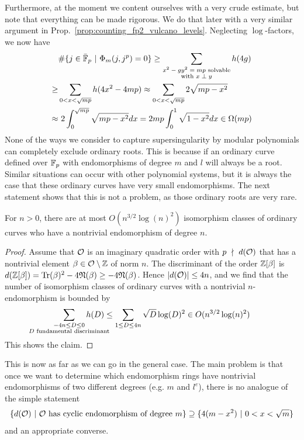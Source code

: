 Furthermore, at the moment we content ourselves with a very crude estimate, but note that everything can be made rigorous.
We do that later with a very similar argument in Prop.~\ref{prop:counting_fp2_vulcano_levels}.
Neglecting $\log$-factors, we now have
\begin{align*}
    &\#\{ j \in \bar{\mathbb{F}}_p \ | \ \Phi_m(j, j^p) = 0 \} \geq \sum_{\substack{\text{$x^2 - gy^2 = mp$ solvable}\\\text{with $x \perp y$}}} h(4g) \\
    \geq& \sum_{0 < x < \sqrt{mp}} h(4x^2 - 4m p) \approx \sum_{0 < x < \sqrt{mp}} 2\sqrt{mp - x^2} \\
    \approx& \ 2\int_0^{\sqrt{mp}} \sqrt{mp - x^2} dx = 2mp \int_0^1 \sqrt{1 - x^2} dx \in \Omega(m p)
\end{align*}
None of the ways we consider to capture supersingularity by modular polynomials can completely exclude ordinary roots.
This is because if an ordinary curve defined over $\mathbb{F}_p$ with endomorphisms of degree $m$ and $l$ will always be a root.
Similar situations can occur with other polynomial systems, but it is always the case that these ordinary curves have very small endomorphisms.
The next statement shows that this is not a problem, as those ordinary roots are very rare.
\begin{prop}
    \label{prop:small_endomorphism_rare}
    For $n > 0$, there are at most $O(n^{3/2}\log(n)^2)$ isomorphism classes of ordinary curves who have a nontrivial endomorphism of degree $n$.
\end{prop}
\begin{proof}
    Assume that $\mathcal{O}$ is an imaginary quadratic order with $p \ \nmid \  d(\mathcal{O})$ that has a nontrivial element $\beta \in \mathcal{O} \setminus \mathbb{Z}$ of norm $n$.
    The discriminant of the order $\mathbb{Z}[\beta]$ is $d(\mathbb{Z}[\beta]) = \mathrm{Tr}(\beta)^2 - 4\mathfrak{N}(\beta) \geq -4\mathfrak{N}(\beta)$.
    Hence $|d(\mathcal{O})| \leq 4n$, and we find that the number of isomorphism classes of ordinary curves with a nontrivial $n$-endomorphism is bounded by
    \begin{align*}
        \sum_{\substack{-4n \leq D \leq 0\\\mathclap{\text{$D$ fundamental discriminant}}}} h(D) \leq \sum_{1 \leq D \leq 4n} \sqrt{D}\log(D)^2 \in O(n^{3/2}\log(n)^2)
    \end{align*}
    This shows the claim.
\end{proof}
This is now as far as we can go in the general case.
The main problem is that once we want to determine which endomorphism rings have nontrivial endomorphisms of two different degrees (e.g. $m$ and $l^e$), there is no analogue of the simple statement
\begin{equation*}
    \{ d(\mathcal{O}) \ | \ \text{$\mathcal{O}$ has cyclic endomorphism of degree $m$}\} \supseteq \{ 4(m - x^2) \ | \ 0 < x < \sqrt{m} \}
\end{equation*}
and an appropriate converse.

